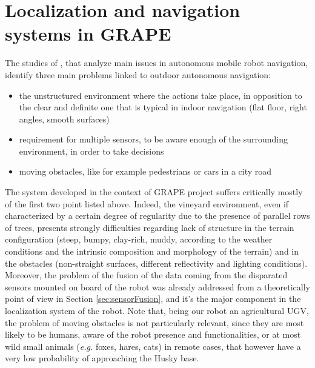 
\chapter{Localization and navigation systems in GRAPE} \label{chap:localization}

The studies of \cite{outdoorNavigation}, that analyze main issues in autonomous mobile robot navigation, identify three main problems linked to outdoor autonomous navigation:
\begin{itemize}
	\item the unstructured environment where the actions take place, in opposition to the clear and definite one that is typical in indoor navigation (flat floor, right angles, smooth surfaces)
	\item requirement for multiple sensors, to be aware enough of the surrounding environment, in order to take decisions
	\item moving obstacles, like for example pedestrians or cars in a city road
\end{itemize}
The system developed in the context of \ac{GRAPE} project suffers critically mostly of the first two point listed above. Indeed, the vineyard environment, even if characterized by a certain degree of regularity due to the presence of parallel rows of trees, presents strongly difficulties regarding lack of structure in the terrain configuration (steep, bumpy, clay-rich, muddy, according to the weather conditions and the intrinsic composition and morphology of the terrain) and in the obstacles (non-straight surfaces, different reflectivity and lighting conditions). Moreover, the problem of the fusion of the data coming from the disparated sensors mounted on board of the robot was already addressed from a theoretically point of view in Section \ref{sec:sensorFusion}, and it's the major component in the localization system of the robot. Note that, being our robot an agricultural \ac{UGV}, the problem of moving obstacles is not particularly relevant, since they are most likely to be humans, aware of the robot presence and functionalities, or at most wild small animals (\textit{e.g.} foxes, hares, cats) in remote cases, that however have a very low probability of approaching the Husky base.




